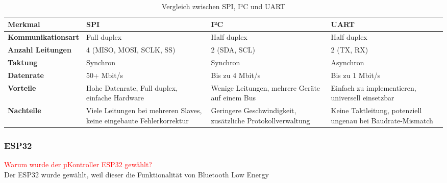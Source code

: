 \begin{table}[ht]
\renewcommand{\arraystretch}{1.5} %
\centering
\begin{tabular}{@{}p{3.4cm}p{3.2cm}p{3.2cm}p{3.2cm}@{}}
\toprule
\textbf{Merkmal}        & \textbf{SPI} & \textbf{I²C} & \textbf{UART} \\ \midrule
\textbf{Kommunikationsart} & Full duplex & Half duplex & Half duplex \\
\textbf{Anzahl Leitungen} & 4 (MISO, MOSI, SCLK, SS) & 2 (SDA, SCL) & 2 (TX, RX) \\
\textbf{Taktung}        & Synchron & Synchron & Asynchron \\
\textbf{Datenrate}      & 50+ Mbit/s & Bis zu 4 Mbit/s & Bis zu 1 Mbit/s \\
\textbf{Vorteile}       & Hohe Datenrate, Full duplex, einfache Hardware & Wenige Leitungen, mehrere Geräte auf einem Bus & Einfach zu implementieren, universell einsetzbar \\
\textbf{Nachteile}      & Viele Leitungen bei mehreren Slaves, keine eingebaute Fehlerkorrektur & Geringere Geschwindigkeit, zusätzliche Protokollverwaltung & Keine Taktleitung, potenziell ungenau bei Baudrate-Mismatch \\
\bottomrule
\end{tabular}
\caption{Vergleich zwischen SPI, I²C und UART}
\label{tab:spi_vergleich}
\end{table}

\subsubsection{ESP32}
\textcolor{red}{Warum wurde der µKontroller ESP32 gewählt?}\\
Der ESP32 wurde gewählt, weil dieser die Funktionalität von Bluetooth Low Energy 

